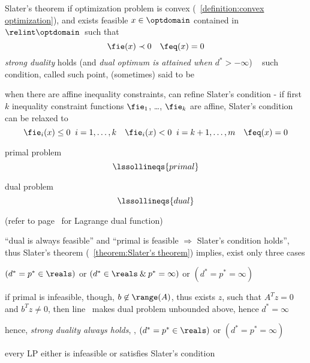 \documentclass[17pt,landscape]{foils}
\begin{document}
{\begin{mytheorem}{Slater's theorem}
	if
	optimization problem is convex (~\ref{definition:convex optimization}),
	and exists feasible $x\in\optdomain$ contained in $\relint \optdomain$\
	such that
	$$
		\fie(x) \prec 0\quad \feq(x) = 0
	$$
	\emph{strong duality} holds
	(and \emph{dual optimum is attained when $d^\ast>-\infty$})
	\shrinkspacewithintheoremslike\
	\ibit
	\iitem
		such condition, called 
	\iitem
		such point, (sometimes) said to be 
	\eit

	\shrinkspacewithintheoremslike
	when there are affine inequality constraints,
	can refine Slater's condition
	- if first $k$ inequality constraint functions $\fie_1$, \ldots, $\fie_k$ are affine,
	Slater's condition can be relaxed to
	$$
		\fie_i(x)\leq 0\;\;i=1,\ldots,k
		\quad
		\fie_i(x) < 0\;\;i=k+1,\ldots,m
		\quad
		\feq(x) = 0
	$$
\end{mytheorem}



\bit
\item
	primal problem
	$$
		\lssollineqs{primal}
	$$

\vitem
	dual problem
	$$
		\lssollineqs{dual}
	$$

	(refer to page~\pageref{page:dual function of LS solution of lines equations} for Lagrange dual function)

\vitem
	``dual is always feasible''
	and
	``primal is feasible $\Rightarrow$ Slater's condition holds'',
	thus
	Slater's theorem (\theoremname~\ref{theorem:Slater's theorem})
	implies,
	exist only three cases
	\bit
	\item
		$(d^\ast = p^\ast \in \reals)$
		or
		$(d^\ast \in \reals\:\&\: p^\ast = \infty)$
		or
		$(d^\ast = p^\ast = \infty)$
	\eit

\vitem
	if primal is infeasible, though,
	$b\not\in\range(A)$,
	thus
	exists $z$, such that $A^Tz=0$ and $b^Tz \neq0$,
	then line \ makes dual problem unbounded above,
	hence $d^\ast=\infty$

\vitem
	hence, \emph{strong duality always holds},
	\ie, $(d^\ast= p^\ast \in \reals)$ or $(d^\ast = p^\ast = \infty)$
\eit



\bit
\item
	every LP either is infeasible or satisfies Slater's condition

}
\end{document}
